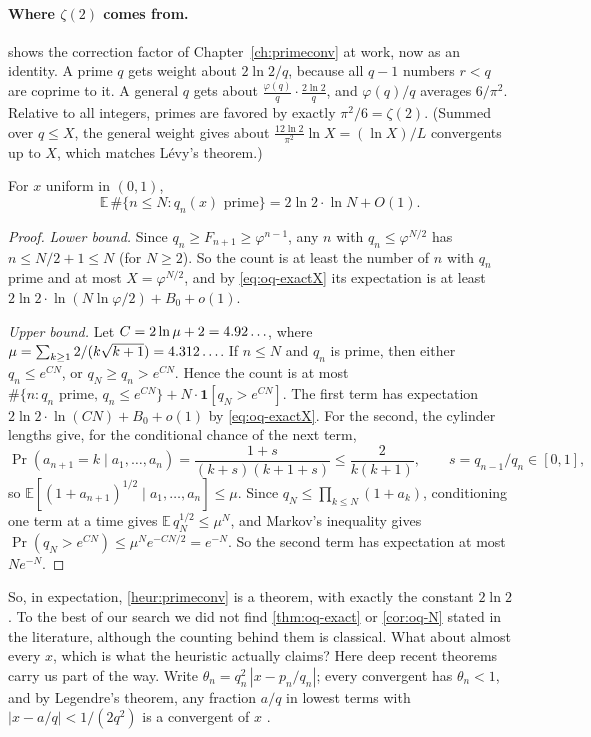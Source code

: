 \paragraph{Where $\zeta(2)$ comes from.}  shows the correction factor of Chapter~\ref{ch:primeconv} at work, now as an identity. A prime $q$ gets weight about $2\ln 2/q$, because all $q - 1$ numbers $r < q$ are coprime to it. A general $q$ gets about $\frac{\varphi(q)}{q}\cdot \frac{2\ln 2}{q}$, and $\varphi(q)/q$ averages $6/\pi^2$. Relative to all integers, primes are favored by exactly $\pi^2/6 = \zeta(2)$. (Summed over $q \le X$, the general weight gives about $\frac{12\ln 2}{\pi^2}\ln X = (\ln X)/L$ convergents up to $X$, which matches Lévy's theorem.)

\begin{corollary}\label{cor:oq-N}
For $x$ uniform in $(0,1)$,
\[
  \mathbb{E}\,\#\{n \le N : q_n(x) \text{ prime}\} = 2\ln 2 \cdot \ln N + O(1).
\]
\end{corollary}

\begin{proof}
\emph{Lower bound.} Since $q_n \ge F_{n+1} \ge \varphi^{n-1}$, any $n$ with $q_n \le \varphi^{N/2}$ has $n \le N/2 + 1 \le N$ (for $N \ge 2$). So the count is at least the number of $n$ with $q_n$ prime and at most $X = \varphi^{N/2}$, and by \eqref{eq:oq-exactX} its expectation is at least $2\ln 2 \cdot \ln(N \ln\varphi/2) + B_0 + o(1)$.

\emph{Upper bound.} Let $C = 2\ln\mu + 2 = 4.92\ldots$, where $\mu = \sum_{k \ge 1} 2/(k\sqrt{k+1}) = 4.312\ldots$. If $n \le N$ and $q_n$ is prime, then either $q_n \le e^{CN}$, or $q_N \ge q_n > e^{CN}$. Hence the count is at most $\#\{n : q_n \text{ prime},\, q_n \le e^{CN}\} + N\cdot\mathbf{1}[q_N > e^{CN}]$. The first term has expectation $2\ln 2 \cdot\ln(CN) + B_0 + o(1)$ by \eqref{eq:oq-exactX}. For the second, the cylinder lengths give, for the conditional chance of the next term,
\[
  \Pr(a_{n+1} = k \mid a_1, \dots, a_n) = \frac{1 + s}{(k+s)(k+1+s)} \le \frac{2}{k(k+1)}, \qquad s = q_{n-1}/q_n \in [0, 1],
\]
so $\mathbb{E}[(1 + a_{n+1})^{1/2} \mid a_1, \dots, a_n] \le \mu$. Since $q_N \le \prod_{k \le N}(1 + a_k)$, conditioning one term at a time gives $\mathbb{E}\,q_N^{1/2} \le \mu^N$, and Markov's inequality gives $\Pr(q_N > e^{CN}) \le \mu^N e^{-CN/2} = e^{-N}$. So the second term has expectation at most $N e^{-N}$.
\end{proof}

So, in expectation, \cref{heur:primeconv} is a theorem, with exactly the constant $2\ln 2$. To the best of our search we did not find \cref{thm:oq-exact} or \cref{cor:oq-N} stated in the literature, although the counting behind them is classical. What about almost every $x$, which is what the heuristic actually claims? Here deep recent theorems carry us part of the way. Write $\theta_n = q_n^2\,|x - p_n/q_n|$; every convergent has $\theta_n < 1$, and by Legendre's theorem, any fraction $a/q$ in lowest terms with $|x - a/q| < 1/(2q^2)$ is a convergent of $x$ \citep[Thm.~184]{HardyWright2008}.

